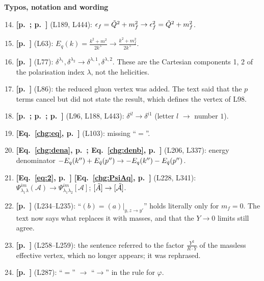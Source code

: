 \documentclass[9pt]{article}
\numberwithin{equation}{section}
\begin{document}
\noindent\textbf{Typos, notation and wording}
\begin{enumerate}\setcounter{enumi}{13}
    \item \textbf{[p.~\pageref{chg:epsdefa}; p.~\pageref{chg:epsdefb}]} (L189, L444): $\epsilon_{f}=\Tilde{Q}^{2}+m^{2}_{f}\rightarrow\epsilon^{2}_{f}=\Tilde{Q}^{2}+m^{2}_{f}$.
    \item \textbf{[p.~\pageref{chg:Eq}]} (L63): $E_{q}(k)=\frac{k^{2}+m^{2}}{2k^{+}}\rightarrow\frac{k^{2}+m^{2}_{f}}{2k^{+}}$.
    \item \textbf{[p.~\pageref{chg:mu1}]} (L77): $\delta^{\lambda_{1}},\delta^{\lambda_{2}}\rightarrow\delta^{\lambda,1},\delta^{\lambda,2}$. These are the Cartesian components 1, 2 of the polarisation index $\lambda$, not the helicities.
    \item \textbf{[p.~\pageref{chg:gvert}]} (L86): the reduced gluon vertex was added. The text said that the $p$ terms cancel but did not state the result, which defines the vertex of L98.
    \item \textbf{[p.~\pageref{chg:dila}; p.~\pageref{chg:dilb}; p.~\pageref{chg:dilc}]} (L96, L188, L443): $\delta^{il}\rightarrow\delta^{i1}$ (letter $l$ $\rightarrow$ number $1$).
    \item \textbf{[Eq.~\eqref{chg:eq}, p.~\pageref{chg:eq}]} (L103): missing ``$=$''.
    \item \textbf{[Eq.~\eqref{chg:dena}, p.~\pageref{chg:dena}; Eq.~\eqref{chg:denb}, p.~\pageref{chg:denb}]} (L206, L337): energy denominator $-E_{q}(k'')+E_{\Bar{q}}(p'')\rightarrow-E_{q}(k'')-E_{\Bar{q}}(p'')$.
    \item \textbf{[Eq.~\eqref{eq:2}, p.~\pageref{eq:2}]} \textbf{[Eq.~\eqref{chg:PsiAq}, p.~\pageref{chg:PsiAq}]} (L228, L341): $\Psi^{im}_{\lambda_{1}\lambda}(\mathcal{A})\rightarrow\Psi^{im}_{\lambda_{1}\lambda_{2}}[\mathcal{A}]$; $[\Tilde{A}]\rightarrow[\Tilde{\mathcal{A}}]$.
    \item \textbf{[p.~\pageref{chg:ba}]} (L234--L235): ``$(b)=(a)|_{y,z\rightarrow y'}$'' holds literally only for $m_{f}=0$. The text now says what replaces it with masses, and that the $Y\rightarrow 0$ limits still agree.
    \item \textbf{[p.~\pageref{chg:Y2RY}]} (L258--L259): the sentence referred to the factor $\frac{Y^{2}}{R\cdot Y}$ of the massless effective vertex, which no longer appears; it was rephrased.
    \item \textbf{[p.~\pageref{chg:phirule}]} (L287): ``$=$'' $\rightarrow$ ``$\rightarrow$'' in the rule for $\varphi$.

\end{enumerate}
\end{document}
